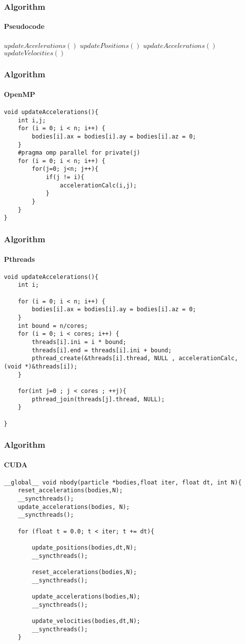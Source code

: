 \begin{frame}[fragile]
	\frametitle{Algorithm}
	\framesubtitle{Pseudocode}
	\begin{center}
		\begin{algorithmic}
			\STATE $updateAccelerations()$
			    \STATE $updatePositions()$
			    \STATE $updateAccelerations()$
			    \STATE $updateVelocities()$
			\ENDFOR
		\end{algorithmic}
	\end{center}
\end{frame}

\begin{frame}[fragile]
\frametitle{Algorithm}
\framesubtitle{OpenMP}
\begin{lstlisting}[style=C]
void updateAccelerations(){
    int i,j;
    for (i = 0; i < n; i++) {
        bodies[i].ax = bodies[i].ay = bodies[i].az = 0;
    }
    #pragma omp parallel for private(j)
    for (i = 0; i < n; i++) {
        for(j=0; j<n; j++){
            if(j != i){
                accelerationCalc(i,j);
            }
        }
    }
}
\end{lstlisting}
\end{frame}

\begin{frame}[fragile]
\frametitle{Algorithm}
\framesubtitle{Pthreads}
\begin{lstlisting}[style=C]
void updateAccelerations(){
    int i;

    for (i = 0; i < n; i++) {
        bodies[i].ax = bodies[i].ay = bodies[i].az = 0;
    }
    int bound = n/cores;
    for (i = 0; i < cores; i++) {
        threads[i].ini = i * bound;
        threads[i].end = threads[i].ini + bound;
        pthread_create(&threads[i].thread, NULL , accelerationCalc, (void *)&threads[i]);
    }

    for(int j=0 ; j < cores ; ++j){
        pthread_join(threads[j].thread, NULL);
    }

}
\end{lstlisting}
\end{frame}

\begin{frame}[fragile]
\frametitle{Algorithm}
\framesubtitle{CUDA}
\begin{lstlisting}[style=C]
__global__ void nbody(particle *bodies,float iter, float dt, int N){
    reset_accelerations(bodies,N);
    __syncthreads();
    update_accelerations(bodies, N);
    __syncthreads();
    
    for (float t = 0.0; t < iter; t += dt){
    
        update_positions(bodies,dt,N);
        __syncthreads();

        reset_accelerations(bodies,N);
        __syncthreads();

        update_accelerations(bodies,N);
        __syncthreads();
    
        update_velocities(bodies,dt,N);
        __syncthreads();
    }
\end{lstlisting}
\end{frame}
